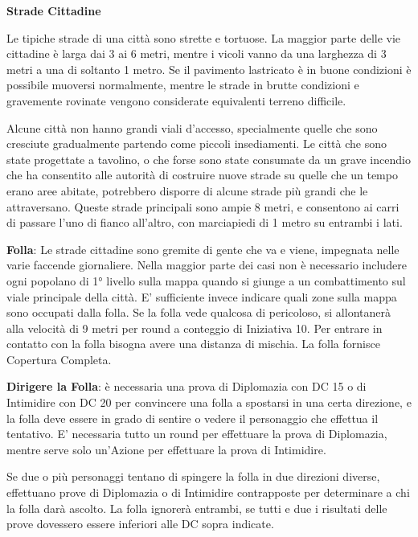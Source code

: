 \documentclass[a4paper,twoside,openany]{book}
\begin{document}
\begin{multicols}{2}

\medskip

\textbf{Strade Cittadine}

Le tipiche strade di una città sono strette e tortuose. La maggior parte delle vie cittadine è larga dai 3 ai 6 metri, mentre i vicoli vanno da una larghezza di 3 metri a una di soltanto 1 metro. Se il pavimento lastricato è in buone condizioni è possibile muoversi normalmente, mentre le strade in brutte condizioni e gravemente rovinate vengono considerate equivalenti terreno difficile.

Alcune città non hanno grandi viali d'accesso, specialmente quelle che sono cresciute gradualmente partendo come piccoli insediamenti. Le città che sono state progettate a tavolino, o che forse sono state consumate da un grave incendio che ha consentito alle autorità di costruire nuove strade su quelle che un tempo erano aree abitate, potrebbero disporre di alcune strade più grandi che le attraversano. Queste strade principali sono ampie 8 metri, e consentono ai carri di passare l'uno di fianco all'altro, con marciapiedi di 1 metro su entrambi i lati.

\textbf{Folla}: Le strade cittadine sono gremite di gente che va e viene, impegnata nelle varie faccende giornaliere. Nella maggior parte dei casi non è necessario includere ogni popolano di 1° livello sulla mappa quando si giunge a un combattimento sul viale principale della città. E' sufficiente invece indicare quali zone sulla mappa sono occupati dalla folla. Se la folla vede qualcosa di pericoloso, si allontanerà alla velocità di 9 metri per round a conteggio di Iniziativa 10. Per entrare in contatto con la folla bisogna avere una distanza di mischia. La folla fornisce Copertura Completa.

\textbf{Dirigere la Folla}: è necessaria una prova di Diplomazia con DC 15 o di Intimidire con DC 20 per convincere una folla a spostarsi in una certa direzione, e la folla deve essere in grado di sentire o vedere il personaggio che effettua il tentativo. E' necessaria tutto un round per effettuare la prova di Diplomazia, mentre serve solo un'Azione per effettuare la prova di Intimidire.

Se due o più personaggi tentano di spingere la folla in due direzioni diverse, effettuano prove di Diplomazia o di Intimidire contrapposte per determinare a chi la folla darà ascolto. La folla ignorerà entrambi, se tutti e due i risultati delle prove dovessero essere inferiori alle DC sopra indicate.


\end{multicols}
\end{document}
